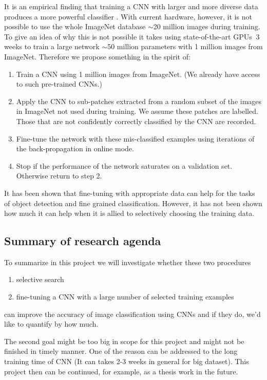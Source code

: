 \documentclass[a4paper]{article}
\begin{document}
It is an empirical finding that training a CNN with larger and more
diverse data produces a more powerful classifier
\cite{Bissacco:iccv:13,Sermanet:iclr:13}. With current hardware,
however, it is not possible to use the whole ImageNet database
$\sim$20 million images during training. To give an idea of why this
is not possible it takes using state-of-the-art GPUs $~$3 weeks to
train a large network $\sim$50 million parameters with 1 million
images from ImageNet. Therefore we propose something in the spirit of:
    \begin{enumerate}
    \item Train a CNN using 1 million images from ImageNet. (We
      already have access to such pre-trained CNNs.)
    \item Apply the CNN to sub-patches extracted from a random subset
      of the images in ImageNet not used during training. We assume
      these patches are labelled. Those that are not confidently
      correctly classified by the CNN are recorded.
    \item Fine-tune the network with these mis-classified examples
      using iterations of the back-propagation in online mode.
    \item Stop if the performance of the network saturates on a
      validation set. Otherwise return to step 2.
    \end{enumerate}
It has been shown that fine-tuning with appropriate data can help
\cite{Agrawal:eccv:14} for the tasks of object detection and fine
grained classification. However, it has not been shown how much it
can help when it is allied to selectively choosing the training data. 

\subsection{Summary of research agenda}
To summarize in this project we will investigate whether these two procedures
\begin{enumerate}
  \item selective search
  \item fine-tuning a CNN with a large number of selected training examples
\end{enumerate}
can improve the accuracy of image classification using CNNs and if
they do, we'd like to quantify by how much.

The second goal might be too big in scope for this project 
and might not be finished in timely manner. One of the reason can be addressed to 
the long training time of CNN (It can takes 2-3 weeks in general for big dataset). 
This project then can be continued, for example, as a thesis work in the future.
\end{document}

